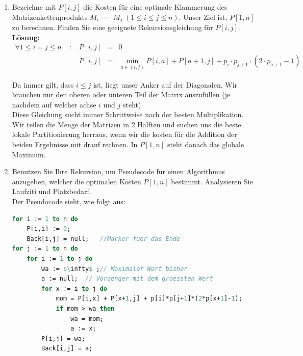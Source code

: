 \documentclass[11pt,a4paper,ngerman]{article}
\begin{document}
\begin{enumerate}[\bfseries (a)]


\item Bezeichne mit $P[i,j]$ die Kosten für eine optimale Klammerung des Matrizenkettenprodukts $M_i \cdot \cdots \cdot M_j \; ( 1 \leq i \leq j \leq n)$. Unser Ziel ist, $P[1,n]$ zu berechnen. Finden Sie eine geeignete Rekursionsgleichung für $P[i,j]$.\\

\textbf{Lösung:}
$$
\begin{array}{lcrcl}
\forall 1 \leq i = j \leq n &\; : \;& P[i,j] &=& 0\\
&& P[i,j] &=& \underset{a \in (i,j)}{\min} P[i,a] + P[a+1,j] + p_i \cdot p_{j+1} \cdot (2 \cdot p_{a+1} - 1)
\end{array}
$$

Da immer gilt, dass $i \leq j$ ist, liegt unser Anker auf der Diagonalen. Wir brauchen nur den oberen oder unteren Teil der Matrix auszufüllen (je nachdem auf welcher achse $i$ und $j$ steht).\\

Diese Gleichung sucht immer Schrittweise nach der besten Multiplikation. Wir teilen die Menge der Matrizen in 2 Hälften und suchen uns die beste lokale Partitionierung herraus, wenn wir die kosten für die Addition der beiden Ergebnisse mit drauf rechnen. In $P[1,n]$ steht danach das globale Maximum.

\item Benutzen Sie Ihre Rekursion, um Pseudecode für einen Algorithmus anzugeben, welcher die optimalen Kosten $P[1,n]$ bestimmt. Analysieren Sie Laufziti und Platzbedarf.\\

Der Pseudocode sieht, wie folgt aus:

\begin{lstlisting}[language=Pascal, numbers=right]
for i := 1 to n do
	P[i,i] := 0;
	Back[i,j] = null;	//Marker fuer das Ende
for j := 1 to n do
	for i := 1 to j do
		wa := $\infty$ ;// Maximaler Wert bisher
		a := null;	// Voraenger mit dem groessten Wert
		for x := i to j do
			mom = P[i,x] + P[x+1,j] + p[i]*p[j+1]*(2*p[x+1]-1);
			if mom > wa then
				wa = mom;
				a := x;
		P[i,j] = wa;
		Back[i,j] = a;
\end{lstlisting}

\pagebreak


\end{enumerate}
\end{document}
